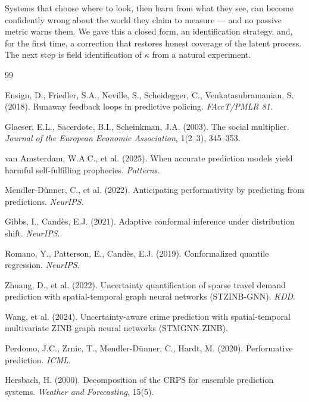 \documentclass[10pt]{article}
\begin{document}
Systems that choose where to look, then learn from what they see, can become
confidently wrong about the world they claim to measure --- and no passive metric
warns them. We gave this a closed form, an identification strategy, and, for the
first time, a correction that restores honest coverage of the latent process.
The next step is field identification of $\kappa$ from a natural experiment.


\begin{thebibliography}{99}

 Ensign, D., Friedler, S.A., Neville, S., Scheidegger, C.,
Venkatasubramanian, S. (2018). Runaway feedback loops in predictive policing.
\textit{FAccT/PMLR 81}.

 Glaeser, E.L., Sacerdote, B.I., Scheinkman, J.A. (2003).
The social multiplier. \textit{Journal of the European Economic Association},
1(2--3), 345--353.

 van Amsterdam, W.A.C., et al. (2025). When accurate
prediction models yield harmful self-fulfilling prophecies. \textit{Patterns}.

 Mendler-D\"unner, C., et al. (2022). Anticipating
performativity by predicting from predictions. \textit{NeurIPS}.

 Gibbs, I., Cand\`es, E.J. (2021). Adaptive conformal
inference under distribution shift. \textit{NeurIPS}.

 Romano, Y., Patterson, E., Cand\`es, E.J. (2019).
Conformalized quantile regression. \textit{NeurIPS}.

 Zhuang, D., et al. (2022). Uncertainty quantification of
sparse travel demand prediction with spatial-temporal graph neural networks
(STZINB-GNN). \textit{KDD}.

 Wang, et al. (2024). Uncertainty-aware crime prediction with
spatial-temporal multivariate ZINB graph neural networks (STMGNN-ZINB).

 Perdomo, J.C., Zrnic, T., Mendler-D\"unner, C., Hardt, M.
(2020). Performative prediction. \textit{ICML}.

 Hersbach, H. (2000). Decomposition of the CRPS for
ensemble prediction systems. \textit{Weather and Forecasting}, 15(5).

\end{thebibliography}
\end{document}
